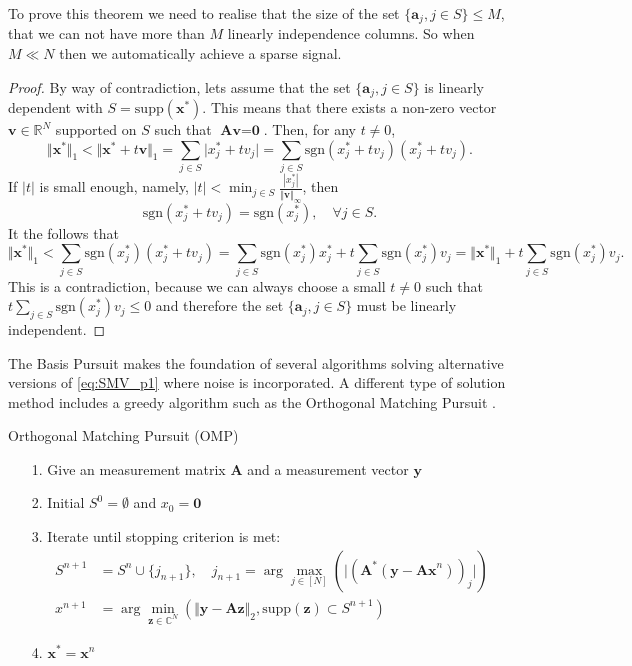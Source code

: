 To prove this theorem we need to realise that the size of the set $\{\textbf{a}_j, j \in S \} \leq M$, that we can not have more than $M$ linearly independence columns. So when $M \ll N$ then we automatically achieve a sparse signal.
\begin{proof}
By way of contradiction, lets assume that the set $\{\textbf{a}_j, j \in S \}$ is linearly dependent with $S =  \text{supp} (\textbf{x}^{\ast})$. This means that there exists a non-zero vector $\textbf{v} \in \mathbb{R}^N$ supported on $S$ such that $\textbf{Av} = \textbf{0}$. Then, for any $t \neq 0$,
$$
\Vert \textbf{x}^{\ast} \Vert_1 < \Vert \textbf{x}^{\ast} + t \textbf{v} \Vert_1 = \sum_{j \in S} \vert x_j^{\ast} + t v_j \vert = \sum_{j \in S} \text{sgn}(x_j^{\ast} + t v_j )(x_j^{\ast} + t v_j ).
$$
If $|t|$ is small enough, namely, $|t| < \min_{j \in S} \frac{|x_j^{\ast}|}{\Vert \textbf{v} \Vert_{\infty}}$, then
$$
\text{sgn}(x_j^{\ast} + t v_j) = \text{sgn}(x_j^{\ast}), \quad \forall j \in S.
$$
It the follows that
$$
\Vert \textbf{x}^{\ast} \Vert_1 < \sum_{j \in S} \text{sgn}(x_j^{\ast})(x_j^{\ast} + t v_j ) = \sum_{j \in S} \text{sgn}(x_j^{\ast})x_j^{\ast} + t \sum_{j \in S} \text{sgn}(x_j^{\ast})v_j = \Vert \textbf{x}^{\ast} \Vert_1 + t \sum_{j \in S} \text{sgn}(x_j^{\ast})v_j.
$$
This is a contradiction, because we can always choose a small $t \neq 0$ such that $t \sum_{j \in S} \text{sgn}(x_j^{\ast})v_j \leq 0$ and therefore the set $\{\textbf{a}_j, j \in S \}$ must be linearly independent.
\end{proof}
The Basis Pursuit makes the foundation of several algorithms solving alternative versions of \eqref{eq:SMV_p1} where noise is incorporated. A different type of solution method includes a greedy algorithm such as the Orthogonal Matching Pursuit \cite[P. 65]{FR}.    
\begin{algorithm}[H]
\caption{Orthogonal Matching Pursuit (OMP)}
\begin{itemize}
\item[1.] Give an measurement matrix $\mathbf{A}$ and a measurement vector $\mathbf{y}$
\item[2.] Initial $S^0 = \emptyset$ and $x_0 = \mathbf{0}$
\item[3.] Iterate until stopping criterion is met:
\begin{align*}
S^{n+1} &= S^n \cup \lbrace j_{n+1} \rbrace, \quad j_{n+1} = \arg \max_{j \in [N]} ( \vert (\mathbf{A}^\ast (\mathbf{y} - \mathbf{Ax}^n))_j\vert) \\
x^{n+1} &= \arg \min_{\mathbf{z} \in \mathbb{C}^N} (\Vert \mathbf{y} - \mathbf{Az} \Vert_2, \text{supp}(\mathbf{z}) \subset S^{n+1})
\end{align*}
\item[4.] $\mathbf{x}^\ast = \mathbf{x}^n$
\end{itemize}      
\end{algorithm}
      
